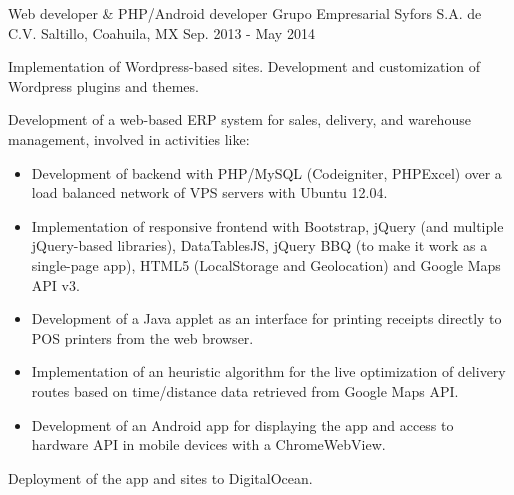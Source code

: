 \begin{cventries}

\cventry
{Web developer \& PHP/Android developer} %
{Grupo Empresarial Syfors S.A. de C.V.} %
{Saltillo, Coahuila, MX} %
{Sep. 2013 - May 2014} %
{ %
	\begin{cvitems}
		\item {Implementation of Wordpress-based sites. Development and customization of Wordpress plugins and themes.}
		\item {Development of a web-based ERP system for sales, delivery, and warehouse management, involved in activities like:}
		\begin{itemize}
			\item {Development of backend with PHP/MySQL (Codeigniter, PHPExcel) over a load balanced network of VPS servers with Ubuntu 12.04.}
			\item {Implementation of responsive frontend with Bootstrap, jQuery (and multiple jQuery-based libraries), DataTablesJS, jQuery BBQ (to make it work as a single-page app), HTML5 (LocalStorage and Geolocation) and Google Maps API v3.}
			\item {Development of a Java applet as an interface for printing receipts directly to POS printers from the web browser.}
			\item {Implementation of an heuristic algorithm for the live optimization of delivery routes based on time/distance data retrieved from Google Maps API.}
			\item {Development of an Android app for displaying the app and access to hardware API in mobile devices with a ChromeWebView.}
		\end{itemize}
		\item {Deployment of the app and sites to DigitalOcean.}
	\end{cvitems} 
}



\end{cventries}
